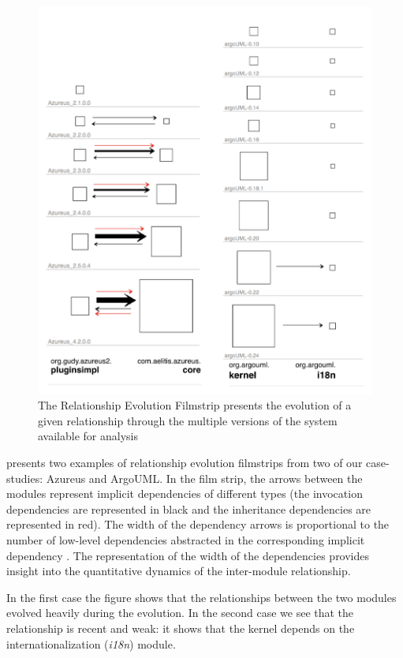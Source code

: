 \documentclass[preprint,12pt]{elsarticle}
\begin{document}
\begin{figure}[ht!]
\begin{center}
\includegraphics[width=\linewidth]{images/Filmstrip}
\caption{The Relationship Evolution Filmstrip presents the evolution of a given relationship through the multiple versions of the system available for analysis}
\end{center}
\end{figure}

 presents two examples of relationship evolution filmstrips from two of our case-studies: Azureus and ArgoUML. In the film strip, the arrows between the modules represent implicit dependencies of different types (the invocation dependencies are represented in black and the inheritance dependencies are represented in red). The width of the dependency arrows is proportional to the number of low-level dependencies abstracted in the corresponding implicit dependency \cite{lungu-relevo}. The representation of the width of the dependencies provides insight into the quantitative dynamics of the inter-module relationship.

In the first case the figure shows that the relationships between the two modules evolved heavily during the evolution. In the second case we see that the relationship is recent and weak: it shows that the kernel depends on the internationalization ({\em i18n}) module. 
\end{document}
